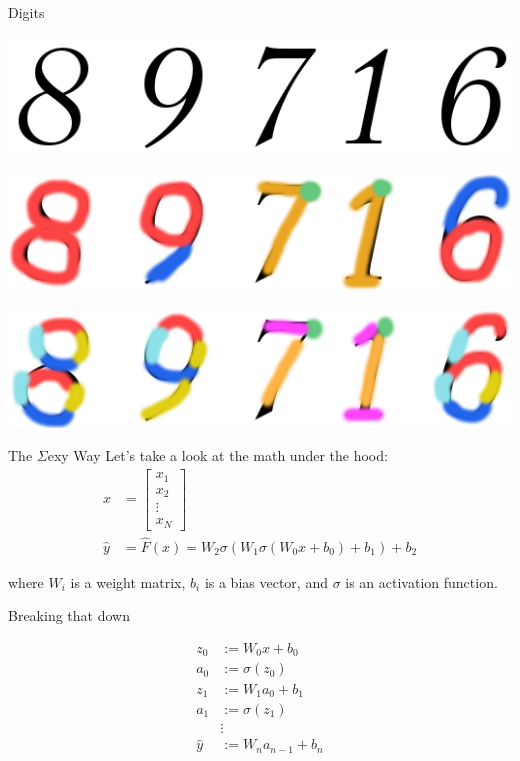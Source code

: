 \documentclass[11pt]{beamer}
\begin{document}
\begin{frame}{Digits}
\begin{center}

\includegraphics[scale=0.5]{digits}

\pause

\includegraphics[scale=0.5]{digits2}

\pause

\includegraphics[scale=0.5]{digits3}
\end{center}
\end{frame}

\begin{frame}{The $\Sigma$exy Way}
Let's take a look at the math under the hood:
\begin{align*}
x &= \left[\begin{array}{c}
x_1 \\
x_2 \\
\vdots \\
x_N
\end{array}\right] \\
\widehat{y} &= \widehat{F}(x) = W_2\sigma(W_1\sigma(W_0x + b_0) + b_1) + b_2
\end{align*}

where $W_i$ is a weight matrix, $b_i $ is a bias vector, and $\sigma$ is an activation function.
\end{frame}

\begin{frame}{Breaking that down}

\begin{align*}
z_0 &:= W_0x + b_0 \\
a_0 &:= \sigma(z_0) \\
z_1 &:= W_1a_0 + b_1 \\
a_1 &:= \sigma(z_1) \\
&\vdots \\
\widehat{y} &:= W_n a_{n-1} + b_n
\end{align*}

\end{frame}
\end{document}
